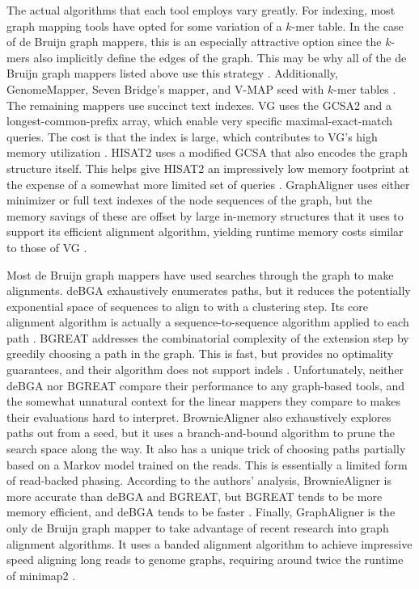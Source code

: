 The actual algorithms that each tool employs vary greatly. 
For indexing, most graph mapping tools have opted for some variation of a $k$-mer table. 
In the case of de Bruijn graph mappers, this is an especially attractive option since the $k$-mers also implicitly define the edges of the graph. 
This may be why all of the de Bruijn graph mappers listed above use this strategy \cite{Holley_2012, Limasset_2016, Liu_2016, Heydari_2018, Rautiainen_2019b}. 
Additionally, GenomeMapper, Seven Bridge's mapper, and V-MAP seed with $k$-mer tables \cite{Schneeberger_2009, Rakocevic_2019, Vaddadi_2019}. 
The remaining mappers use succinct text indexes.
VG uses the GCSA2 \cite{Siren_2017} and a longest-common-prefix array, which enable very specific maximal-exact-match queries.
The cost is that the index is large, which contributes to VG's high memory utilization \cite{Garrison_2019}.
HISAT2 uses a modified GCSA \cite{Siren_2014}  that also encodes the graph structure itself.
This helps give HISAT2 an impressively low memory footprint at the expense of a somewhat more limited set of queries \cite{Kim_2019}.
GraphAligner uses either minimizer or full text indexes of the node sequences of the graph, but the memory savings of these are offset by large in-memory structures that it uses to support its efficient alignment algorithm, yielding runtime memory costs similar to those of VG \cite{Rautiainen_2019b}.

Most de Bruijn graph mappers have used searches through the graph to make alignments.
deBGA exhaustively enumerates paths, but it reduces the potentially exponential space of sequences to align to with a clustering step.
Its core alignment algorithm is actually a sequence-to-sequence algorithm applied to each path \cite{Liu_2016}.
BGREAT addresses the combinatorial complexity of the extension step by greedily choosing a path in the graph.
This is fast, but provides no optimality guarantees, and their algorithm does not support indels \cite{Limasset_2016}.
Unfortunately, neither deBGA nor BGREAT compare their performance to any graph-based tools, and the somewhat unnatural context for the linear mappers they compare to makes their evaluations hard to interpret.
BrownieAligner also exhaustively explores paths out from a seed, but it uses a branch-and-bound algorithm to prune the search space along the way.
It also has a unique trick of choosing paths partially based on a Markov model trained on the reads.
This is essentially a limited form of read-backed phasing.
According to the authors' analysis, BrownieAligner is more accurate than deBGA and BGREAT, but BGREAT tends to be more memory efficient, and deBGA tends to be faster \cite{Heydari_2018}.
Finally, GraphAligner is the only de Bruijn graph mapper to take advantage of recent research into graph alignment algorithms.
It uses a banded alignment algorithm to achieve impressive speed aligning long reads to genome graphs, requiring around twice the runtime of minimap2 \cite{Rautiainen_2019b, Li_2018}.

